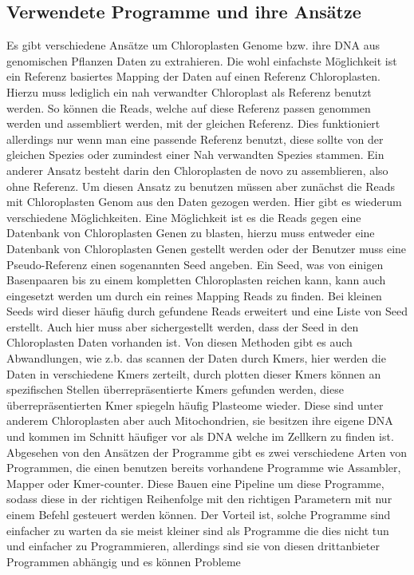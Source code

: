 \documentclass{scrartcl}
\begin{document}
\subsection{Verwendete Programme und ihre Ansätze}
\label{sec-2-5}
Es gibt verschiedene Ansätze um Chloroplasten Genome bzw. ihre DNA aus genomischen Pflanzen Daten zu extrahieren. Die wohl einfachste Möglichkeit ist ein Referenz basiertes
Mapping der Daten auf einen Referenz Chloroplasten. Hierzu muss lediglich ein nah verwandter Chloroplast als Referenz benutzt werden. So können die Reads, welche auf diese Referenz
passen genommen werden und assembliert werden, mit der gleichen Referenz. Dies funktioniert allerdings nur wenn man eine passende Referenz benutzt, diese sollte von der gleichen Spezies oder
zumindest einer Nah verwandten Spezies stammen. Ein anderer Ansatz besteht darin den Chloroplasten de novo zu assemblieren, also ohne Referenz. Um diesen Ansatz zu benutzen müssen
aber zunächst die Reads mit Chloroplasten Genom aus den Daten gezogen werden. Hier gibt es wiederum verschiedene Möglichkeiten. Eine Möglichkeit ist es die Reads gegen eine Datenbank
von Chloroplasten Genen zu blasten, hierzu muss entweder eine Datenbank von Chloroplasten Genen gestellt werden oder der Benutzer muss eine Pseudo-Referenz einen sogenannten Seed angeben.
Ein Seed, was von einigen Basenpaaren bis zu einem kompletten Chloroplasten reichen kann, kann auch eingesetzt werden um durch ein reines Mapping Reads zu finden. Bei kleinen Seeds wird dieser
häufig durch gefundene Reads erweitert und eine Liste von Seed erstellt. Auch hier muss aber sichergestellt werden, dass der Seed in den Chloroplasten Daten vorhanden ist.
Von diesen Methoden gibt es auch Abwandlungen, wie z.b. das scannen der Daten durch Kmers, hier werden die Daten in verschiedene Kmers zerteilt, durch plotten dieser Kmers können
an spezifischen Stellen überrepräsentierte Kmers gefunden werden, diese überrepräsentierten Kmer spiegeln häufig Plasteome wieder. Diese sind unter anderem Chloroplasten aber auch
Mitochondrien, sie besitzen ihre eigene DNA und kommen im Schnitt häufiger vor als DNA welche im Zellkern zu finden ist. 
Abgesehen von den Ansätzen der Programme gibt es zwei verschiedene Arten von Programmen, die einen benutzen bereits vorhandene Programme wie Assambler, Mapper oder Kmer-counter. Diese 
Bauen eine Pipeline um diese Programme, sodass diese in der richtigen Reihenfolge mit den richtigen Parametern mit nur einem Befehl gesteuert werden können. Der Vorteil ist, solche Programme
sind einfacher zu warten da sie meist kleiner sind als Programme die dies nicht tun und einfacher zu Programmieren, allerdings sind sie von diesen drittanbieter Programmen abhängig und es können Probleme 
\end{document}
